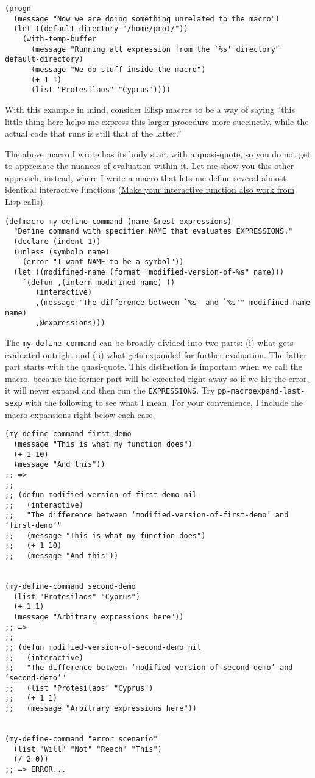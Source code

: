\documentclass[11pt]{ctexart}
\begin{document}
\begin{verbatim}
(progn
  (message "Now we are doing something unrelated to the macro")
  (let ((default-directory "/home/prot/"))
    (with-temp-buffer
      (message "Running all expression from the `%s' directory" default-directory)
      (message "We do stuff inside the macro")
      (+ 1 1)
      (list "Protesilaos" "Cyprus"))))
\end{verbatim}

With this example in mind, consider Elisp macros to be a way of saying ``this little thing here helps me express this larger procedure more succinctly, while the actual code that runs is still that of the latter.''

The above macro I wrote has its body start with a quasi-quote, so you do not get to appreciate the nuances of evaluation within it. Let me show you this other approach, instead, where I write a macro that lets me define several almost identical interactive functions (\hyperref[sec:org10592f7]{Make your interactive function also work from Lisp calls}).

\begin{verbatim}
(defmacro my-define-command (name &rest expressions)
  "Define command with specifier NAME that evaluates EXPRESSIONS."
  (declare (indent 1))
  (unless (symbolp name)
    (error "I want NAME to be a symbol"))
  (let ((modifined-name (format "modified-version-of-%s" name)))
    `(defun ,(intern modifined-name) ()
       (interactive)
       ,(message "The difference between `%s' and `%s'" modifined-name name)
       ,@expressions)))
\end{verbatim}

The \texttt{my-define-command} can be broadly divided into two parts: (i) what gets evaluated outright and (ii) what gets expanded for further evaluation. The latter part starts with the quasi-quote. This distinction is important when we call the macro, because the former part will be executed right away so if we hit the error, it will never expand and then run the \texttt{EXPRESSIONS}. Try \texttt{pp-macroexpand-last-sexp} with the following to see what I mean. For your convenience, I include the macro expansions right below each case.

\begin{verbatim}
(my-define-command first-demo
  (message "This is what my function does")
  (+ 1 10)
  (message "And this"))
;; =>
;;
;; (defun modified-version-of-first-demo nil
;;   (interactive)
;;   "The difference between ‘modified-version-of-first-demo’ and ‘first-demo’"
;;   (message "This is what my function does")
;;   (+ 1 10)
;;   (message "And this"))


(my-define-command second-demo
  (list "Protesilaos" "Cyprus")
  (+ 1 1)
  (message "Arbitrary expressions here"))
;; =>
;;
;; (defun modified-version-of-second-demo nil
;;   (interactive)
;;   "The difference between ‘modified-version-of-second-demo’ and ‘second-demo’"
;;   (list "Protesilaos" "Cyprus")
;;   (+ 1 1)
;;   (message "Arbitrary expressions here"))


(my-define-command "error scenario"
  (list "Will" "Not" "Reach" "This")
  (/ 2 0))
;; => ERROR...
\end{verbatim}
\end{document}
